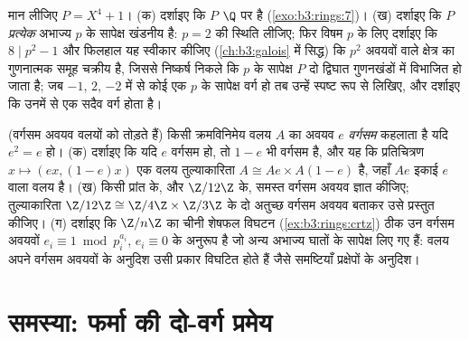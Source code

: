 \begin{exercise}[$\star\star\star$]\label{exo:b3:rings:11}
मान लीजिए $P = X^4 + 1$।
(क) दर्शाइए कि $P$ $\Q$ पर  है (\cref{exo:b3:rings:7})।
(ख) दर्शाइए कि $P$ \emph{प्रत्येक} अभाज्य $p$ के सापेक्ष
खंडनीय है: $p = 2$ की स्थिति लीजिए; फिर विषम $p$ के लिए दर्शाइए
कि $8 \mid p^2 - 1$ और फिलहाल यह स्वीकार कीजिए (\cref{ch:b3:galois} में सिद्ध) कि $p^2$
अवयवों वाले क्षेत्र का गुणनात्मक समूह चक्रीय है, जिससे निष्कर्ष
निकले कि $p$ के सापेक्ष $P$ दो द्विघात गुणनखंडों में विभाजित
हो जाता है; जब $-1$, $2$, $-2$ में से कोई एक $p$ के सापेक्ष
वर्ग हो तब उन्हें स्पष्ट रूप से लिखिए, और दर्शाइए कि उनमें से एक
सदैव वर्ग होता है।
\end{exercise}

\begin{exercise}[$\star\star$]\label{exo:b3:rings:12}
(वर्गसम अवयव वलयों को तोड़ते हैं) किसी क्रमविनिमेय वलय $A$ का
अवयव $e$ \emph{वर्गसम} कहलाता है यदि $e^2 = e$ हो।
(क) दर्शाइए कि यदि $e$ वर्गसम हो, तो $1 - e$ भी वर्गसम है, और यह
कि प्रतिचित्रण $x \mapsto (ex, (1-e)x)$ एक वलय तुल्याकारिता $A
\cong Ae \times A(1-e)$ है, जहाँ $Ae$
इकाई $e$ वाला वलय है।
(ख) किसी प्रांत के, और $\Z/12\Z$ के, समस्त वर्गसम अवयव ज्ञात कीजिए;
तुल्याकारिता $\Z/12\Z \cong \Z/4\Z \times \Z/3\Z$ के दो अतुच्छ वर्गसम अवयव बताकर उसे प्रस्तुत
कीजिए।
(ग) दर्शाइए कि $\Z/n\Z$ का चीनी शेषफल विघटन (\cref{ex:b3:rings:crtz}) ठीक उन वर्गसम
अवयवों $e_i \equiv 1 \bmod p_i^{a_i}$, $e_i \equiv 0$ के अनुरूप है जो अन्य अभाज्य घातों के सापेक्ष
लिए गए हैं: वलय अपने वर्गसम अवयवों के अनुदिश उसी प्रकार विघटित
होते हैं जैसे समष्टियाँ प्रक्षेपों के अनुदिश।
\end{exercise}

\section{समस्या: फर्मा की दो-वर्ग प्रमेय}

